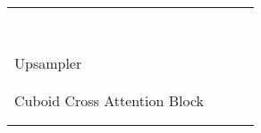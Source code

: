 \documentclass{article}
\begin{document}
\begin{table}[!tb]
\begin{center}
{\begin{tabular}{l|l|c|c}
                                                        &   &                       &              \\
                                                        &             &                       &              \\
                                                        &       &                       &              \\
                                                        &   &                       &              \\
                                                        &             &                       &              \\
                                                        &   &                  &              \\
                                                        &             &                       &              \\
                                                        &       &                       &              \\\hline
    \multirow{2}{*}{Upsampler}                          &   &  &              \\
                                                        &    &                       & \\\hline 
    \multirow{12}{*}{Cuboid Cross Attention Block }&  &                       &              \\
                                                        &   &                       &              \\
                                                        &             &                       &              \\
                                                        &       &                       &              \\
                                                        &   &                       &              \\
                                                        &             &                       &              \\
                                                        &       &                       &              \\
                                                        &   &                       &              \\
                                                        &             &                       &              \\

\end{tabular}}
\end{center}
\end{table}
\end{document}
